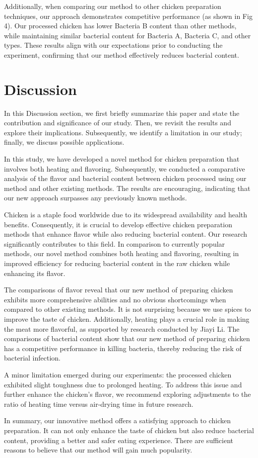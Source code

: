 \documentclass[a4paper,12pt]{article}
\begin{document}
    Additionally, when comparing our method to other chicken preparation techniques, our approach demonstrates competitive performance (as shown in Fig 4). Our processed chicken has lower Bacteria B content than other methods, while maintaining similar bacterial content for Bacteria A, Bacteria C, and other types. These results align with our expectations prior to conducting the experiment, confirming that our method effectively reduces bacterial content.

    \section{Discussion}
    In this Discussion section, we first briefly summarize this paper and state the contribution and significance of our study. Then, we revisit the results and explore their implications. Subsequently, we identify a limitation in our study; finally, we discuss possible applications.
    
    In this study, we have developed a novel method for chicken preparation that involves both heating and flavoring. Subsequently, we conducted a comparative analysis of the flavor and bacterial content between chicken processed using our method and other existing methods. The results are encouraging, indicating that our new approach surpasses any previously known methods.

    Chicken is a staple food worldwide due to its widespread availability and health benefits. Consequently, it is crucial to develop effective chicken preparation methods that enhance flavor while also reducing bacterial content. Our research significantly contributes to this field. In comparison to currently popular methods\cite{rch}\cite{dundee}\cite{fjh}\cite{zy}, our novel method combines both heating and flavoring, resulting in improved efficiency for reducing bacterial content in the raw chicken while enhancing its flavor.

    The comparisons of flavor reveal that our new method of preparing chicken exhibits more comprehensive abilities and no obvious shortcomings when compared to other existing methods. It is not surprising because we use spices to improve the taste of chicken. Additionally, heating plays a crucial role in making the meat more flavorful, as supported by research conducted by Jiayi Li\cite{ljy}. The comparisons of bacterial content show that our new method of preparing chicken has a competitive performance in killing bacteria, thereby reducing the risk of bacterial infection. 

    A minor limitation emerged during our experiments: the processed chicken exhibited slight toughness due to prolonged heating. To address this issue and further enhance the chicken’s flavor, we recommend exploring adjustments to the ratio of heating time versus air-drying time in future research.

    In summary, our innovative method offers a satisfying approach to chicken preparation. It can not only enhance the taste of chicken but also reduce bacterial content, providing a better and safer eating experience. There are sufficient reasons to believe that our method will gain much popularity.
	
	
\end{document}
